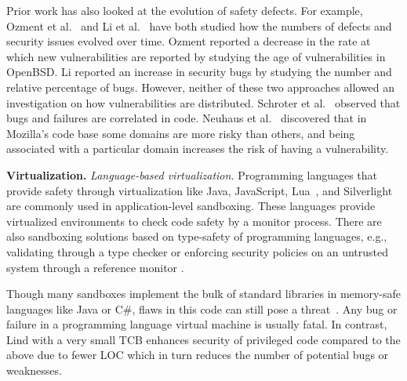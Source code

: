 Prior work has also looked at the evolution of safety defects. For example, 
Ozment et al.~\cite{ozment2006milk} and Li et al.~\cite{li2006have} have 
both studied how the numbers of defects and security issues evolved over 
time. Ozment reported a decrease in the rate at which new vulnerabilities 
are reported by studying the age of vulnerabilities in OpenBSD. Li 
reported an increase in security bugs by studying the number and relative 
percentage of bugs. However, neither of these two approaches allowed 
an investigation on how vulnerabilities are distributed. 
Schroter et al.~\cite{schroter2006predicting} observed that bugs and
failures are correlated in code. Neuhaus et al.~\cite{neuhaus2007predicting} 
discovered that in Mozilla's code base
some domains are more risky than others, and being associated with a 
particular domain increases the risk of having a vulnerability. 

\textbf{Virtualization.}
\textit{Language-based virtualization.}
Programming languages that provide safety through virtualization like
Java, JavaScript, Lua~\cite{Lua}, and
Silverlight~\cite{Silverlight} are commonly used in application-level
sandboxing. These languages provide virtualized environments to
check code safety by a monitor process. 
%
There are also sandboxing solutions based on type-safety of programming
languages, e.g., validating through a type checker \cite{JS-Sandboxing}
or enforcing security policies on an untrusted system through a
reference monitor \cite{JS-Sandboxing1}. %


Though many sandboxes implement the bulk of standard libraries in
memory-safe languages like Java or C\#, flaws in this code can
still pose a threat~\cite{JavaBugs, Java-Lessons}. 
Any bug or failure in a programming language virtual
machine is usually fatal. In contrast, Lind with a very small TCB
enhances security of privileged code compared to the above due to fewer LOC which in turn reduces the number of potential bugs or weaknesses. %

